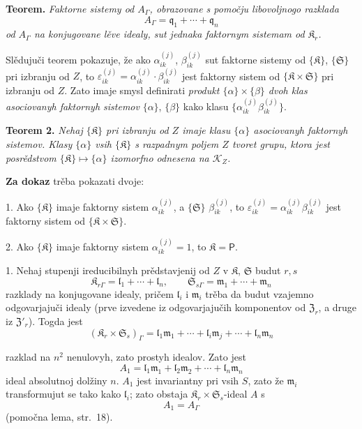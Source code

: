 \documentclass[11pt]{article}
\begin{document}
\textbf{Teorem.} \emph{Faktorne sistemy od \(A_\Gamma\), obrazovane s pomočju libovoljnogo razklada}
\[
A_\Gamma=\mathfrak q_1+\cdots+\mathfrak q_n
\]
\emph{od \(A_\Gamma\) na konjugovane lěve idealy, sut jednaka faktornym sistemam od \(\mathfrak K_r\).}

Slědujuči teorem pokazuje, že ako \(\alpha_{ik}^{(j)}\), \(\beta_{ik}^{(j)}\) sut faktorne sistemy od \(\{\mathfrak K\}\), \(\{\mathfrak S\}\) pri izbranju od \(Z\), to \(\varepsilon_{ik}^{(j)}=\alpha_{ik}^{(j)}\cdot\beta_{ik}^{(j)}\) jest faktorny sistem od \(\{\mathfrak K\times\mathfrak S\}\) pri izbranju od \(Z\). Zato imaje smysl definirati \emph{produkt \(\{\alpha\}\times\{\beta\}\) dvoh klas asociovanyh faktornyh sistemov} \(\{\alpha\}\), \(\{\beta\}\) kako klasu \(\{\alpha_{ik}^{(j)}\beta_{ik}^{(j)}\}\).

\textbf{Teorem 2.} \emph{Nehaj \(\{\mathfrak K\}\) pri izbranju od \(Z\) imaje klasu \(\{\alpha\}\) asociovanyh faktornyh sistemov. Klasy \(\{\alpha\}\) vsih \(\{\mathfrak K\}\) s razpadnym poljem \(Z\) tvoret grupu, ktora jest posrědstvom \(\{\mathfrak K\}\mapsto\{\alpha\}\) izomorfno odnesena na \(\mathscr K_Z\).}

\textbf{Za dokaz} trěba pokazati dvoje:

1. Ako \(\{\mathfrak K\}\) imaje faktorny sistem \(\alpha_{ik}^{(j)}\), a \(\{\mathfrak S\}\) \(\beta_{ik}^{(j)}\), to \(\varepsilon_{ik}^{(j)}=\alpha_{ik}^{(j)}\beta_{ik}^{(j)}\) jest faktorny sistem od \(\{\mathfrak K\times\mathfrak S\}\).

2. Ako \(\{\mathfrak K\}\) imaje faktorny sistem \(\alpha_{ik}^{(j)}=1\), to \(\mathfrak K=\mathsf P\).

1. Nehaj stupenji ireducibilnyh prědstavjenij od \(Z\) v \(\mathfrak K\), \(\mathfrak S\) budut \(r,s\)
\[
\mathfrak K_{r\Gamma}=\mathfrak l_1+\cdots+\mathfrak l_n,\qquad
\mathfrak S_{s\Gamma}=\mathfrak m_1+\cdots+\mathfrak m_n
\]
razklady na konjugovane idealy, pričem \(\mathfrak l_i\) i \(\mathfrak m_i\) trěba da budut vzajemno odgovarjajuči idealy (prve izvedene iz odgovarjajučih komponentov od \(\mathfrak Z_r\), a druge iz \(\mathfrak Z'_r\)). Togda jest
\[
(\mathfrak K_r\times\mathfrak S_s)_\Gamma
=\mathfrak l_1\mathfrak m_1+\cdots+\mathfrak l_i\mathfrak m_j+\cdots+\mathfrak l_n\mathfrak m_n
\]

razklad na \(n^2\) nenulovyh, zato prostyh idealov. Zato jest
\[
A_1=\mathfrak l_1\mathfrak m_1+\mathfrak l_2\mathfrak m_2+\cdots+\mathfrak l_n\mathfrak m_n
\]
ideal absolutnoj dolžiny \(n\). \(A_1\) jest invariantny pri vsih \(S\), zato že \(\mathfrak m_i\) transformujut se tako kako \(\mathfrak l_i\); zato obstaja \(\mathfrak K_r\times\mathfrak S_s\)-ideal \(A\) s
\[
A_1=A_\Gamma
\]
(pomočna lema, str.~18).
\end{document}
